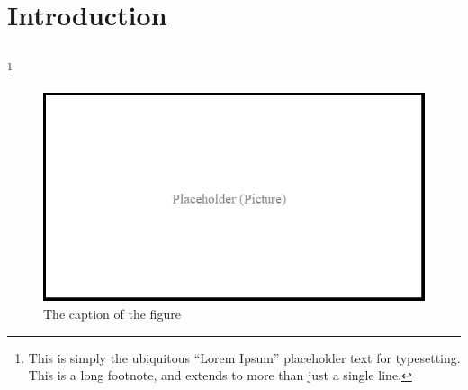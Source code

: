 \documentclass[12pt, oneside]{report}
\begin{document}
\frontmatter

\maketitle
\makesignatures
\makecopyright

\unpacklipsum[1-3]
\makeabstract{\lipsumexp}


\tableofcontents

\listoftables

\listoffigures





\mainmatter %

\chapter{Introduction}
\lipsum[1]
\section{\lipsum[150][1-3]}
\lipsum[3]%
\footnote{This is simply the ubiquitous ``Lorem Ipsum'' placeholder text for typesetting. This is a long footnote, and extends to more than just a single line.}

\begin{figure}[h]
  \centering
  \includegraphics[width=.7\textwidth]{figures/pictures/placeholder}
  \caption{The caption of the figure}
  \label{fig:BlockDiagram1}
\end{figure}
  
\end{document}
